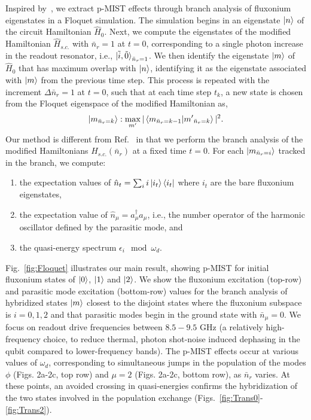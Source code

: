 \documentclass[%
reprint,
superscriptaddress,
 amsmath,amssymb,
 aps,
 prx,
longbibliography,
floatfix,
]{revtex4-2}
\begin{document}
Inspired by~\cite{dumas2024unified,cohen2023reminiscence}, we extract p-MIST effects through branch analysis of fluxonium eigenstates in a Floquet simulation. The simulation begins in an eigenstate $\ket{n}$ of the circuit Hamiltonian $\hat{H}_0$.
Next, we compute the eigenstates of the modified Hamiltonian $\hat{H}_{s.c.}$ with $\bar n_r=1$ at $t=0$, corresponding to a single photon increase in the readout resonator, i.e., $\ket{\tilde{i},\tilde{0}}_{\bar n_r=1}$. We then identify the eigenstate $\ket{m}$ of $\hat{H}_0$  that has maximum overlap with $\ket{n}$, identifying it as the eigenstate associated with $\ket{m}$ from the previous time step. This process is repeated with the increment $\Delta \bar n_r=1$ at $t=0$, such that at each time step $t_k$, a new state is chosen from the Floquet eigenspace of the modified Hamiltonian as,
\begin{align}
\ket{m_{\bar n_r=k}}:\max_{m'}|\braket{m_{\bar n_r=k-1}|{m'}_{\bar n_r=k}}|^2.   
\end{align}
Our method is different from Ref.~\cite{dumas2024unified,cohen2023reminiscence} in that we perform the branch analysis of the modified Hamiltonians $H_{s.c.}(\bar n_r)$ at a fixed time $t=0$. For each $\ket{m_{\bar n_r=i}}$ tracked in the branch, we compute:
\begin{enumerate}
    \item the expectation values of $\hat n_t=\sum_i i\ket{i_t}\bra{i_t}$ where $i_t$ are the bare fluxonium eigenstates,
    \item the expectation value of $\hat n_\mu=a_\mu^\dagger a_\mu$, i.e., the number operator of the harmonic oscillator defined by the parasitic mode, and 
    \item the quasi-energy spectrum $\epsilon_i\mod \omega_d$.
\end{enumerate}

Fig.~\ref{fig:Floquet} illustrates our main result, showing p-MIST for initial fluxonium states of $\ket{0}$, $\ket{1}$ and $\ket{2}$. We show the fluxonium excitation (top-row) and parasitic mode excitation (bottom-row) values for the branch analysis of hybridized states $\ket{m}$ closest to the disjoint states where the fluxonium subspace is $i=0,1,2$ and that parasitic modes begin in the ground state with $\bar n_\mu=0$. We focus on readout drive frequencies between $8.5 - 9.5$ GHz (a relatively high-frequency choice, to reduce thermal, photon shot-noise induced dephasing in the qubit compared to lower-frequency bands). The p-MIST effects occur at various values of $\omega_d$, corresponding to simultaneous jumps in the population of the modes $\phi$ (Figs. 2a-2c, top row) and $\mu=2$ (Figs. 2a-2c, bottom row), as $\bar{n}_r$ varies. At these points, an avoided crossing in quasi-energies confirms the hybridization of the two states involved in the population exchange (Figs.~\ref{fig:Trans0}-\ref{fig:Trans2}).
\end{document}
